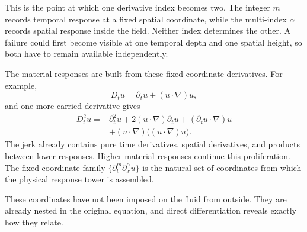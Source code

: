 This is the point at which one derivative index becomes two.
The integer \(m\) records temporal response at a fixed spatial coordinate, while the multi-index \(\alpha\) records spatial response inside the field.
Neither index determines the other.
A failure could first become visible at one temporal depth and one spatial height, so both have to remain available independently.

The material responses are built from these fixed-coordinate derivatives.
For example,
\[
  D_tu
  =
  \partial_tu+(u\cdot\nabla)u,
\]
and one more carried derivative gives
\begin{align*}
  D_t^2u
  ={}&
  \partial_t^2u
  +2(u\cdot\nabla)\partial_tu
  +(\partial_tu\cdot\nabla)u
  \\
  &+
  (u\cdot\nabla)\bigl((u\cdot\nabla)u\bigr).
\end{align*}
The jerk already contains pure time derivatives, spatial derivatives, and products between lower responses.
Higher material responses continue this proliferation.
The fixed-coordinate family \(\{\partial_t^m\partial_x^\alpha u\}\) is the natural set of coordinates from which the physical response tower is assembled.

These coordinates have not been imposed on the fluid from outside.
They are already nested in the original equation, and direct differentiation reveals exactly how they relate.
